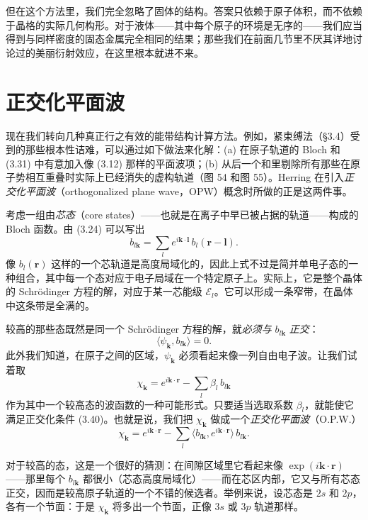 但在这个方法里，我们完全忽略了固体的结构。答案只依赖于原子体积，而不依赖于晶格的实际几何构形。对于液体——其中每个原子的环境是无序的——我们应当得到与同样密度的固态金属完全相同的结果；那些我们在前面几节里不厌其详地讨论过的美丽衍射效应，在这里根本就进不来。

\section{正交化平面波}

现在我们转向几种真正行之有效的能带结构计算方法。例如，紧束缚法（§3.4）受到的那些根本性诘难，可以通过如下做法来化解：(a) 在原子轨道的 Bloch 和 (3.31) 中有意加入像 (3.12) 那样的平面波项；(b) 从后一个和里剔除所有那些在原子势相互重叠时实际上已经消失的虚构轨道（图 54 和图 55）。Herring 在引入\emph{正交化平面波}（orthogonalized plane wave，OPW）概念时所做的正是这两件事。

考虑一组由\emph{芯态}（core states）——也就是在离子中早已被占据的轨道——构成的 Bloch 函数。由 (3.24) 可以写出
\begin{equation*}
b_{l\mathbf{k}}=\sum_l e^{i\mathbf{k}\cdot\mathbf{l}}\,b_l(\mathbf{r}-\mathbf{l}).\tag{3.39}
\end{equation*}
像 $b_l(\mathbf{r})$ 这样的一个芯轨道是高度局域化的，因此上式不过是简并单电子态的一种组合，其中每一个态对应于电子局域在一个特定原子上。实际上，它是整个晶体的 Schrödinger 方程的解，对应于某一芯能级 $\mathcal{E}_l$。它可以形成一条窄带，在晶体中这条带是全满的。

较高的那些态既然是同一个 Schrödinger 方程的解，就\emph{必须与} $b_{l\mathbf{k}}$ \emph{正交}：
\begin{equation*}
\langle\psi_{\mathbf{k}},b_{l\mathbf{k}}\rangle=0.\tag{3.40}
\end{equation*}
此外我们知道，在原子之间的区域，$\psi_{\mathbf{k}}$ 必须看起来像一列自由电子波。让我们试着取
\begin{equation*}
\chi_{\mathbf{k}}=e^{i\mathbf{k}\cdot\mathbf{r}}-\sum_l\beta_l\,b_{l\mathbf{k}}\tag{3.41}
\end{equation*}
作为其中一个较高态的波函数的一种可能形式。只要适当选取系数 $\beta_l$，就能使它满足正交化条件 (3.40)。也就是说，我们把 $\chi_{\mathbf{k}}$ 做成一个\emph{正交化平面波}（O.P.W.）
\begin{equation*}
\chi_{\mathbf{k}}=e^{i\mathbf{k}\cdot\mathbf{r}}-\sum_l\langle b_{l\mathbf{k}},e^{i\mathbf{k}\cdot\mathbf{r}}\rangle\,b_{l\mathbf{k}}.\tag{3.42}
\end{equation*}

对于较高的态，这是一个很好的猜测：在间隙区域里它看起来像 $\exp(i\mathbf{k}\cdot\mathbf{r})$——那里每个 $b_{l\mathbf{k}}$ 都很小（芯态高度局域化）——而在芯区内部，它又与所有芯态正交，因而是较高原子轨道的一个不错的候选者。举例来说，设芯态是 $2s$ 和 $2p$，各有一个节面：于是 $\chi_{\mathbf{k}}$ 将多出一个节面，正像 $3s$ 或 $3p$ 轨道那样。

